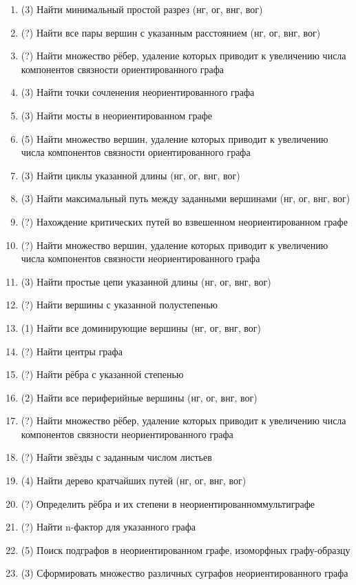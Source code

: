 \begin{enumerate}
\begin{enumerate}[1.]
  \item (3) Найти минимальный простой разрез (нг, ог, внг, вог)
  \item (?) Найти все пары вершин с указанным расстоянием (нг, ог, внг, вог)
  \item (?) Найти множество рёбер, удаление которых приводит к увеличению числа компонентов связности ориентированного графа  
  \item (3) Найти точки сочленения неориентированного графа 
  \item (3) Найти мосты в неориентированном графе 
  \item (5) Найти множество вершин, удаление которых приводит к увеличению числа компонентов связности ориентированного графа  
  \item (3) Найти циклы указанной длины (нг, ог, внг, вог)
  \item (3) Найти максимальный путь между заданными вершинами (нг, ог, внг, вог)
  \item (?) Нахождение критических путей во взвешенном неориентированном графе  
  \item (?) Найти множество вершин, удаление которых приводит к увеличению числа компонентов связности неориентированного графа  
  \item (3) Найти простые цепи указанной длины (нг, ог, внг, вог)
  \item (?) Найти вершины с указанной полустепенью 
  \item (1) Найти все доминирующие вершины (нг, ог, внг, вог)
  \item (?) Найти центры графа  
  \item (?) Найти рёбра с указанной степенью  
  \item (2) Найти все периферийные вершины (нг, ог, внг, вог)
  \item (?) Найти множество рёбер, удаление которых приводит к увеличению числа компонентов связности неориентированного графа  
  \item (?) Найти звёзды с заданным числом листьев  
  \item (4) Найти дерево кратчайших путей (нг, ог, внг, вог)
  \item (?) Определить рёбра и их степени в неориентированноммультиграфе 
  \item (?) Найти n-фактор для указанного графа  
  \item (5) Поиск подграфов в неориентированном графе, изоморфных графу-образцу 
  \item (3) Сформировать множество различных суграфов неориентированного графа 

\end{enumerate}
\end{enumerate}
